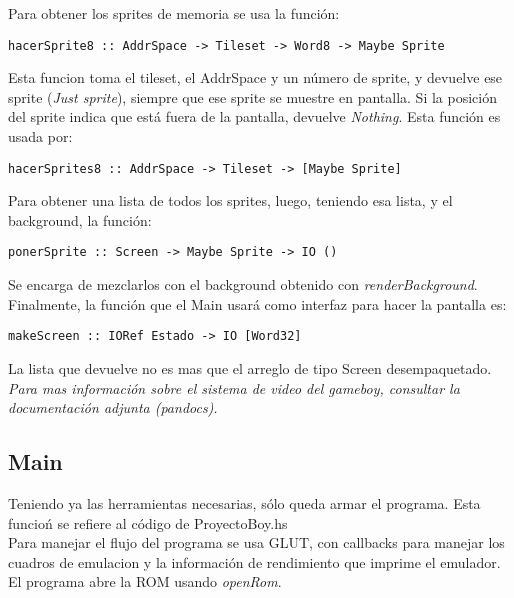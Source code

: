 \documentclass[a4paper,10pt]{report}
\begin{document}
Para obtener los sprites de memoria se usa la función:
\begin{verbatim}
hacerSprite8 :: AddrSpace -> Tileset -> Word8 -> Maybe Sprite
\end{verbatim}
Esta funcion toma el tileset, el AddrSpace y un número de sprite, y devuelve ese sprite (\textit{Just sprite}), siempre que ese sprite se muestre en pantalla. Si la posición del sprite indica que está fuera de la pantalla, devuelve \textit{Nothing}. Esta función es usada por:
\begin{verbatim}
hacerSprites8 :: AddrSpace -> Tileset -> [Maybe Sprite]
\end{verbatim}
Para obtener una lista de todos los sprites, luego, teniendo esa lista, y el background, la función:
\begin{verbatim}
ponerSprite :: Screen -> Maybe Sprite -> IO ()
\end{verbatim}
Se encarga de mezclarlos con el background obtenido con \textit{renderBackground}.\\

Finalmente, la función que el Main usará como interfaz para hacer la pantalla es:
\begin{verbatim}
makeScreen :: IORef Estado -> IO [Word32]
\end{verbatim}
La lista que devuelve no es mas que el arreglo de tipo Screen desempaquetado.\\

\textit{Para mas información sobre el sistema de video del gameboy, consultar la documentación adjunta (pandocs).}
\subsection*{Main}
Teniendo ya las herramientas necesarias, sólo queda armar el programa. Esta funcioń se refiere al código de ProyectoBoy.hs\\

Para manejar el flujo del programa se usa GLUT, con callbacks para manejar los cuadros de emulacion y la información de rendimiento que imprime el emulador. El programa abre la ROM usando \textit{openRom}.\\
\end{document}
